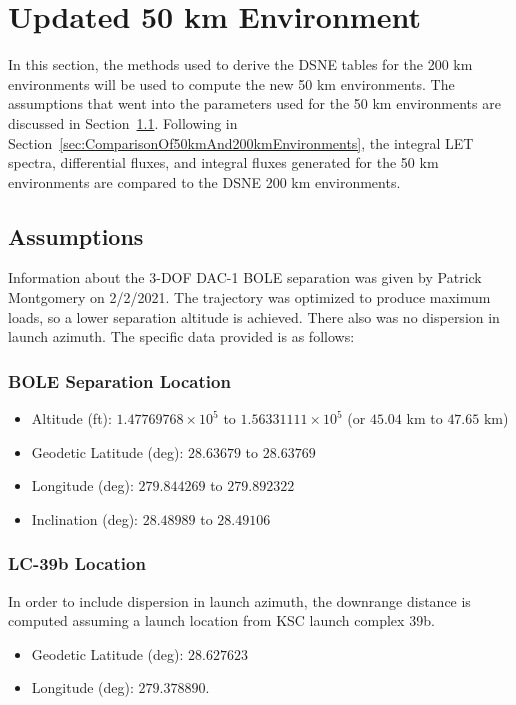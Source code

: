 \documentclass{hitec}
\begin{document}
\clearpage %


\section{Updated 50 km Environment}

In this section, the methods used to derive the DSNE tables for the 200 km environments will be used to compute the new 50 km environments. The assumptions that went into the parameters used for the 50 km environments are discussed in Section~\ref{ssec:Assumptions}. Following in Section~\ref{sec:ComparisonOf50kmAnd200kmEnvironments}, the integral LET spectra, differential fluxes, and integral fluxes generated for the 50 km environments are compared to the DSNE 200 km environments.


\subsection{Assumptions}\label{ssec:Assumptions}

Information about the 3-DOF DAC-1 BOLE separation was given by Patrick Montgomery on 2/2/2021. The trajectory was optimized to produce maximum loads, so a lower separation altitude is achieved. There also was no dispersion in launch azimuth. The specific data provided is as follows:
\subsubsection{BOLE Separation Location}
\begin{itemize}
	\item Altitude (ft): $1.47769768\times 10^5$ to $1.56331111\times 10^5$ (or $45.04$ km to $47.65$ km)
	\item Geodetic Latitude (deg): $28.63679$ to $28.63769$
	\item Longitude (deg): $279.844269$ to $279.892322$
	\item Inclination (deg): $28.48989$ to $28.49106$
\end{itemize}


\subsubsection{LC-39b Location}
In order to include dispersion in launch azimuth, the downrange distance is computed assuming a launch location from KSC launch complex 39b.
\begin{itemize}
	\item Geodetic Latitude (deg): $28.627623$
	\item Longitude (deg): $279.378890$.
\end{itemize}
\end{document}
